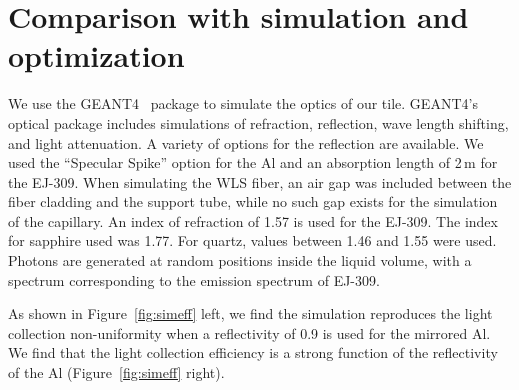 \documentclass[review]{elsarticle}
\begin{document}
\section{Comparison with simulation and optimization}
We use the GEANT4~\cite{Agostinelli2003250} package to simulate the
optics of our tile. GEANT4's optical package includes simulations of
refraction, reflection, wave length shifting, and light attenuation.
A variety of options for the reflection are available. We used the
``Specular Spike'' option for the Al and an absorption length of 2\,m for
the EJ-309. When simulating the WLS fiber, an air gap was included
between the fiber cladding and the support tube, while no such gap
exists for the simulation of the capillary. An index of refraction of
1.57 is used for the EJ-309. The index for sapphire used was 1.77.
For quartz, values between 1.46 and 1.55 were used. Photons are
generated at random positions inside the liquid volume, with a
spectrum corresponding to the emission spectrum of EJ-309.

As shown in Figure~\ref{fig:simeff} left, we find the simulation
reproduces the light collection non-uniformity when a reflectivity of
0.9 is used for the mirrored Al.
We find that the light collection efficiency is a strong function of
the reflectivity of the Al (Figure~\ref{fig:simeff} right).
\end{document}
